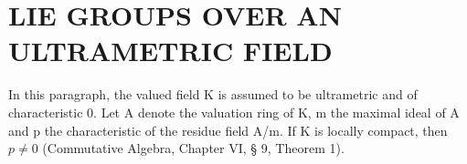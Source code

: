 \section{LIE GROUPS OVER AN ULTRAMETRIC FIELD}

In this paragraph, the valued field K is assumed to be ultrametric and of characteristic 0. Let A denote the valuation ring of K, m the maximal ideal of A and p the characteristic of the residue field A/m. If K is locally compact, then \(p \neq 0\) (Commutative Algebra, Chapter VI, § 9, Theorem 1).

